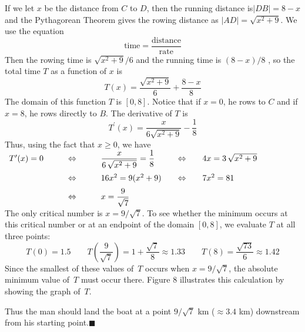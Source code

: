\documentclass{sebase}
\begin{document}
\begin{Solution}
If we let $x$ be the distance from $C$ to $D$, then the running distance
is\linebreak $\left\vert DB\right\vert =8-x$ and the Pythagorean Theorem
gives the rowing distance as \newline
$\left\vert AD\right\vert =\sqrt{x^{2}+9}$. We use the equation 
\[
\text{time}=\frac{\text{distance}}{\text{rate}} 
\]%
Then the rowing time is $\sqrt{x^{2}+9}/6$ and the running time is $(8-x)/8$%
, so the total time $T$ as a function of $x$ is 
\[
T(x)=\frac{\sqrt{x^{2}+9}}{6}+\frac{8-x}{8} 
\]%
The domain of this function $T$ is $[0,8]$. Notice that if $x=0$, he rows to 
$C$ and if $x=8$, he rows directly to $B$. The derivative of $T$ is 
\[
T^{\prime }(x)=\frac{x}{6\sqrt{x^{2}+9}}-\frac{1}{8} 
\]%
Thus, using the fact that $x\geq 0$, we have%
\enlargethispage{\baselineskip}%
\\[6pt]
\hspace*{\fill}$%
\begin{array}{lllll}
T^{\prime }(x)=0 & \qquad \Leftrightarrow \qquad & \dfrac{x}{6\,\sqrt{x^{2}+9%
}}=\dfrac{1}{8}\vspace{6pt} & \quad \Leftrightarrow \quad & 4x=3\,\sqrt{%
x^{2}+9} \\ 
& \qquad \Leftrightarrow \qquad & 16x^{2}=9(x^{2}+9) & \quad \Leftrightarrow
\quad & 7x^{2}=81\vspace{6pt} \\ 
& \qquad \Leftrightarrow \qquad & x=\dfrac{9}{\sqrt{7}} &  & 
\end{array}%
$\hspace*{\fill}\pagebreak \\[6pt]
The only critical number is $x=9/\sqrt{7}$. To see whether the minimum
occurs at this critical number or at an endpoint of the domain $[0,8]$, we
evaluate $T$ at all three points: 
\[
T(0)=1.5\qquad T\left( \frac{9}{\sqrt{7}}\right) =1+\frac{\sqrt{7}}{8}%
\approx 1.33\qquad T(8)=\frac{\sqrt{73}}{6}\approx 1.42 
\]%
Since the smallest of these values of $\,T$ occurs when $x=9/\sqrt{7}$, the
absolute minimum value of $\,T$ must occur there. Figure 8 illustrates this
calculation by showing the graph of $\,T$.

Thus the man should land the boat at a point $9/\sqrt{7}$ km ($\approx \!3.4$
km) downstream from his starting point.\vspace*{-18pt}$\blacksquare $
\end{Solution}
\end{document}
